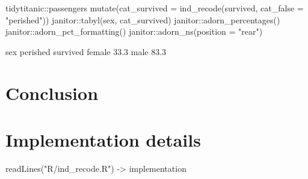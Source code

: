 \begin{Schunk}
\begin{Sinput}
tidytitanic::passengers %
  mutate(cat_survived = ind_recode(survived, 
                                   cat_false = "perished")) %
  janitor::tabyl(sex, cat_survived) %
  janitor::adorn_percentages() %
  janitor::adorn_pct_formatting() %
  janitor::adorn_ns(position = "rear")
\end{Sinput}
\begin{Soutput}
         sex    perished    survived
      female 33.3%
        male 83.3%
\end{Soutput}
\end{Schunk}

\hypertarget{conclusion}{%
\section{Conclusion}\label{conclusion}}

\hypertarget{implementation-details}{%
\section{Implementation details}\label{implementation-details}}

\begin{Schunk}
\begin{Sinput}
readLines("R/ind_recode.R") -> implementation
\end{Sinput}
\end{Schunk}

